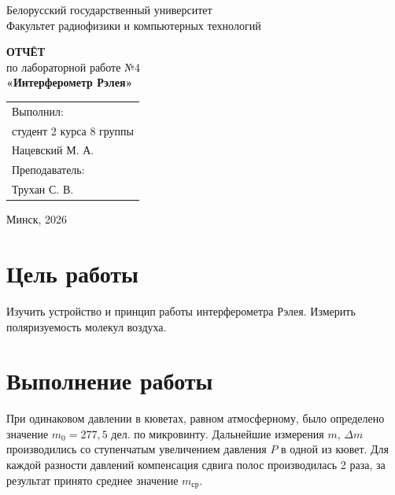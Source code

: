 \documentclass[14pt,a4paper]{extarticle}
\begin{document}
\begin{titlepage}
\begin{center}
\onehalfspacing
Белорусский государственный университет\\
Факультет радиофизики и компьютерных технологий

\vspace{4cm}

\textbf{ОТЧЁТ}\\
по лабораторной работе №4\\[0.3cm]
\textbf{«Интерферометр Рэлея»}

\vspace{4cm}

\begin{flushright}
\begin{tabular}{@{}p{7.5cm}@{}}
\raggedright
Выполнил:\\
студент 2 курса 8 группы\\
Нацевский М. А.\\
Преподаватель:\\
Трухан С. В.\\
\end{tabular}
\end{flushright}

\vfill
Минск, 2026
\end{center}
\end{titlepage}
\setcounter{page}{2}

\section*{Цель работы}

Изучить устройство и принцип работы интерферометра Рэлея. Измерить поляризуемость молекул воздуха.

\section*{Выполнение работы}

При одинаковом давлении в кюветах, равном атмосферному, было определено значение $m_0 = 277{,}5$ дел. по микровинту.
Дальнейшие измерения $m$, $\Delta m$ производились со ступенчатым увеличением давления $P$ в одной из кювет.
Для каждой разности давлений компенсация сдвига полос производилась 2 раза, за результат принято среднее значение $m_{\text{ср}}$.
\end{document}
